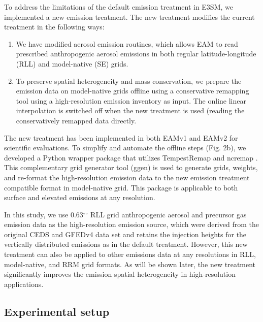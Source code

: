 To address the limitations of the default emission treatment in E3SM, we implemented a new emission treatment. The new treatment modifies the current treatment in the following ways:
\begin{enumerate}
\item	We have modified aerosol emission routines, which allows EAM to read prescribed anthropogenic aerosol emissions in both regular latitude-longitude (RLL) and model-native (SE) grids.
\item	To preserve spatial heterogeneity and mass conservation, we prepare the emission data on model-native grids offline using a conservative remapping tool using a high-resolution emission inventory as input. The online linear interpolation is switched off when the new treatment is used (reading the conservatively remapped data directly. 
\end{enumerate}
The new treatment has been implemented in both EAMv1 and EAMv2 for scientific evaluations. To simplify and automate the offline steps (Fig. 2b), we developed a Python wrapper package that utilizes TempestRemap \citep{ullrich2015arbitrary,ullrich2016arbitrary} and ncremap \citep{zender2008analysis}. This complementary grid generator tool (ggen) is used to generate grids, weights, and re-format the high-resolution emission data to the new emission treatment compatible format in model-native grid. This package is applicable to both surface and elevated emissions at any resolution.  

In this study, we use {0.63}$^{\circ}$$^{\circ}$ RLL grid anthropogenic aerosol and precursor gas emission data as the high-resolution emission source, which were derived from the original CEDS and GFEDv4 data set and retains the injection heights for the vertically distributed emissions as in the default treatment. However, this new treatment can also be applied to other emissions data at any resolutions in RLL, model-native, and RRM grid formats. As will be shown later, the new treatment significantly improves the emission spatial heterogeneity in high-resolution applications.

\subsection{Experimental setup}

